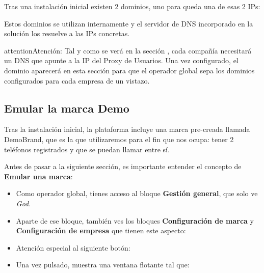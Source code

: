 \documentclass[letterpaper,10pt,spanish]{sphinxmanual}
\begin{document}
Tras una instalación inicial existen 2 dominios, uno para queda una de esas 2 IPs:

\noindent{}

Estos dominios se utilizan internamente y el servidor de DNS incorporado en la solución los resuelve a las IPs concretas.

\begin{notice}{attention}{Atención:}
Tal y como se verá en la sección {\hyperref[internal_calls/brand_portal:domain\string-per\string-company]{}}, cada compañía necesitará un DNS que apunte a la IP del Proxy de Usuarios. Una vez configurado, el dominio aparecerá en esta sección para que el operador global sepa los dominios configurados para cada empresa de un vistazo.
\end{notice}


\subsection{Emular la marca Demo}
\label{internal_calls/god_portal:emular-la-marca-demo}
Tras la instalación inicial, la plataforma incluye una marca pre-creada llamada DemoBrand, que es la que utilizaremos para el fin que nos ocupa: tener 2 teléfonos registrados y que se puedan llamar entre sí.

Antes de pasar a la siguiente sección, es importante entender el concepto de \textbf{Emular una marca}:
\begin{itemize}
\item {} 
Como operador global, tienes acceso al bloque \textbf{Gestión general}, que solo ve \emph{God}.

\item {} 
Aparte de ese bloque, también ves los bloques \textbf{Configuración de marca} y \textbf{Configuración de empresa} que tienen este aspecto:

\end{itemize}

\begin{itemize}
\item {} 
Atención especial al siguiente botón:

\end{itemize}

\begin{itemize}
\item {} 
Una vez pulsado, muestra una ventana flotante tal que:

\end{itemize}
\end{document}
